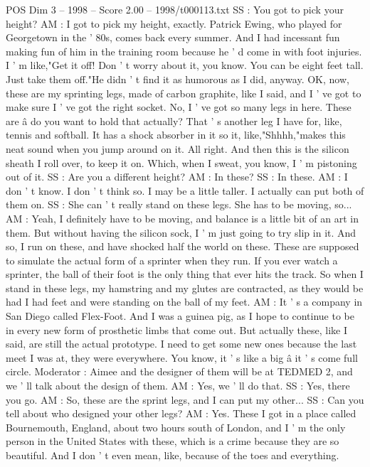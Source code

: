 \begin{textsample}{POS Dim 3 – 1998 – Score 2.00 – 1998/t000113.txt}
SS : You got to pick your height?
AM : I got to pick my height, exactly.
Patrick Ewing, who played for Georgetown in the ' 80s, comes back every summer.
And I had incessant fun making fun of him in the training room because he ' d come in with foot injuries.
I ' m like,"Get it off!
Don ' t worry about it, you know.
You can be eight feet tall.
Just take them off."He didn ' t find it as humorous as I did, anyway.
OK, now, these are my sprinting legs, made of carbon graphite, like I said, and I ' ve got to make sure I ' ve got the right socket.
No, I ' ve got so many legs in here.
These are â do you want to hold that actually?
That ' s another leg I have for, like, tennis and softball.
It has a shock absorber in it so it, like,"Shhhh,"makes this neat sound when you jump around on it.
All right.
And then this is the silicon sheath I roll over, to keep it on.
Which, when I sweat, you know, I ' m pistoning out of it.
SS : Are you a different height?
AM : In these?
SS : In these.
AM : I don ' t know.
I don ' t think so.
I may be a little taller.
I actually can put both of them on.
SS : She can ' t really stand on these legs.
She has to be moving, so...
AM : Yeah, I definitely have to be moving, and balance is a little bit of an art in them.
But without having the silicon sock, I ' m just going to try slip in it.
And so, I run on these, and have shocked half the world on these.
These are supposed to simulate the actual form of a sprinter when they run.
If you ever watch a sprinter, the ball of their foot is the only thing that ever hits the track.
So when I stand in these legs, my hamstring and my glutes are contracted, as they would be had I had feet and were standing on the ball of my feet.
AM : It ' s a company in San Diego called Flex-Foot.
And I was a guinea pig, as I hope to continue to be in every new form of prosthetic limbs that come out.
But actually these, like I said, are still the actual prototype.
I need to get some new ones because the last meet I was at, they were everywhere.
You know, it ' s like a big â it ' s come full circle.
Moderator : Aimee and the designer of them will be at TEDMED 2, and we ' ll talk about the design of them.
AM : Yes, we ' ll do that.
SS : Yes, there you go.
AM : So, these are the sprint legs, and I can put my other...
SS : Can you tell about who designed your other legs?
AM : Yes.
These I got in a place called Bournemouth, England, about two hours south of London, and I ' m the only person in the United States with these, which is a crime because they are so beautiful.
And I don ' t even mean, like, because of the toes and everything.

\end{textsample}
